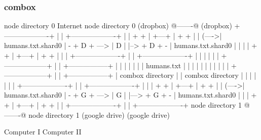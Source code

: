\begin{frame}[fragile]
  \frametitle{combox}

  {\tiny
  \begin{semiverbatim}

         node directory 0                Internet              node directory 0
         (dropbox)                       @-------@             (dropbox)
        +-------------------+            |       |            +-------------------+
        |                   |    + +     | +---+ |     + +    |                   |
  (---->| humans.txt.shard0 | - + D + ---> | D | |--> + D + - | humans.txt.shard0 |
  |     |                   |    + +     | +---+ |     + +    |                   |
  |     +-------------------+            |       |            +-------------------+
  |                                      |       |
  |                                      |       |
 +------------------+                    |       |                        +-----------------+
 |                  |                    |       |                        |                 |
 |  humans.txt      |                    |       |                        |                 |
 |                  |                    |       |                        |                 |
 +------------------+                    |       |                        +-----------------+
  |  combox directory                    |       |                      combox directory
  |                                      |       |
  |                                      |       |
  |     +-------------------+            |       |             +-------------------+
  |     |                   |    + +     | +---+ |      + +    |                   |
  (---->| humans.txt.shard0 | - + G + ---> | G | |---> + G + - | humans.txt.shard0 |
        |                   |    + +     | +---+ |      + +    |                   |
        +-------------------+            |       |             +-------------------+
         node directory 1                @-------@              node directory 1
         (google drive)                                         (google drive)

  Computer I                                                                    Computer II
  \end{semiverbatim}
  }

\end{frame}


